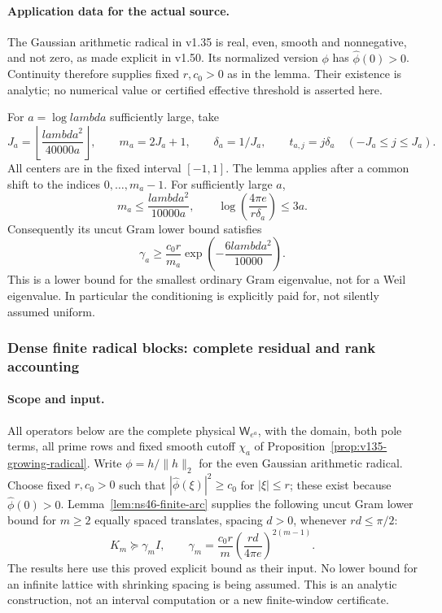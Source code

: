 \documentclass[11pt]{article}
\def\lambda{lambda}%
\theoremstyle{remark}
\begin{document}
\paragraph{Application data for the actual source.}
The Gaussian arithmetic radical in v1.35 is real, even, smooth and
nonnegative, and not zero, as made explicit in v1.50. Its normalized
version $\phi$ has $\widehat\phi(0)>0$. Continuity therefore supplies
fixed $r,c_0>0$ as in the lemma. Their existence is analytic; no numerical
value or certified effective threshold is asserted here.

For $a=\log\lambda$ sufficiently large, take
\[
 J_a=\left\lfloor\frac{\lambda^2}{40000a}\right\rfloor,
 \qquad m_a=2J_a+1,\qquad \delta_a=1/J_a,
 \qquad t_{a,j}=j\delta_a\quad(-J_a\le j\le J_a).
\]
All centers are in the fixed interval $[-1,1]$.
The lemma applies after a common shift to the indices $0,\ldots,m_a-1$.
For sufficiently large $a$,
\[
 m_a\le\frac{\lambda^2}{10000a},\qquad
 \log\left(\frac{4\pi e}{r\delta_a}\right)\le3a.
\]
Consequently its uncut Gram lower bound satisfies
\begin{equation}\label{eq:ns46-gram-asymptotic}
 \gamma_a\ge\frac{c_0r}{m_a}
       \exp\left(-\frac{6\lambda^2}{10000}\right).
\end{equation}
This is a lower bound for the smallest ordinary Gram eigenvalue,
not for a Weil eigenvalue. In particular the conditioning is explicitly
paid for, not silently assumed uniform.


\subsubsection*{Dense finite radical blocks: complete residual and rank accounting}
\label{ns46-a2-sec-block}

\paragraph{Scope and input.}
All operators below are the complete physical $\mathsf W_{e^a}$,
with the domain, both pole terms, all prime rows and fixed smooth
cutoff $\chi_a$ of Proposition~\ref{prop:v135-growing-radical}.
Write $\phi=h/\|h\|_2$ for the even Gaussian arithmetic radical.
Choose fixed $r,c_0>0$ such that $|\widehat\phi(\xi)|^2\ge c_0$
for $|\xi|\le r$; these exist because $\widehat\phi(0)>0$.
Lemma~\ref{lem:ns46-finite-arc} supplies the following
uncut Gram lower bound for $m\ge2$ equally spaced translates,
spacing $d>0$, whenever $rd\le\pi/2$:
\begin{equation}\label{ns46-a2-eq-arc-input}
 K_m\succeq\gamma_m I,\qquad
 \gamma_m=\frac{c_0r}{m}
       \left(\frac{rd}{4\pi e}\right)^{2(m-1)}.
\end{equation}
The results here use this proved explicit bound as their input.
No lower bound for an infinite lattice with shrinking spacing is
being assumed. This is an analytic construction, not an interval
computation or a new finite-window certificate.
\end{document}
